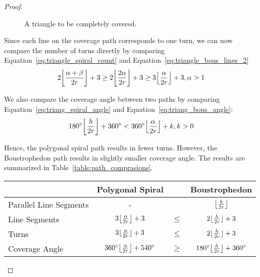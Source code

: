 \documentclass[../main.tex]{subfiles}
\begin{document}
\begin{proof}
\begin{figure}

	\caption{A triangle to be completely covered.}
	\label{fig:triangle_3}
\end{figure}

Since each line on the coverage path corresponds to one turn, we can now compare the number of turns directly by comparing Equation~\ref{eq:triangle_spiral_count} and Equation~\ref{eq:triangle_bous_lines_2}
\begin{equation}
\label{eq:triang_comparison}
\begin{aligned}
	2\floor*{\frac{\alpha+\beta}{2r}}+3\geq2\floor*{\frac{2\alpha}{2r}}+3\geq
	3\floor*{\frac{\alpha}{2r}}+3, \alpha>1
\end{aligned}
\end{equation}

We also compare the coverage angle between two paths by comparing Equation~\ref{eq:triang_spiral_angle} and Equation~\ref{eq:triang_bous_angle}:
\begin{equation}
\label{eq:triang_comparison}
\begin{aligned}
	180^{\circ}\floor*{\frac{h}{2r}}+360^{\circ}<360^{\circ}\floor*{\frac{\alpha}{2r}}+k, k>0
\end{aligned}
\end{equation}


Hence, the polygonal spiral path results in fewer turns. However, the Boustrophedon path results in slightly smaller coverage angle. The results are summarized in Table~\ref{table:path_comprasions}.

\begin{table*}
	\centering
	\begin{tabular}{@{} l ccc@{}}
		\toprule
		& Polygonal Spiral & & Boustrophedon \\
		\midrule
		Parallel Line Segments & - & & $\floor*{\frac{h}{2r}}$\\
		Line Segments & $3\floor*{\frac{\alpha}{2r}}+3$ & $\leq$ & $2\floor{\frac{h}{2r}}+3$\\
		Turns & $3\floor{\frac{\alpha}{2r}}+3$ & $\leq$ & $2\floor{\frac{h}{2r}}+3$\\
		Coverage Angle & $360^{\circ}\floor*{\frac{\alpha}{2r}}+540^{\circ}$ & $\geq$ & $180^{\circ}\floor*{\frac{h}{2r}}+360^{\circ}$ \\


\end{tabular}
\end{table*}
\end{proof}
\end{document}
